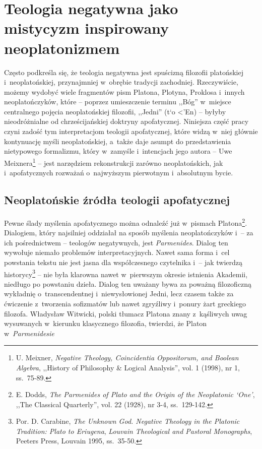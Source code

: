 

\chapter{Teologia negatywna jako mistycyzm inspirowany neoplatonizmem}\label{neopl}

Często podkreśla się, że teologia negatywna jest spuścizną filozofii platońskiej i~neoplatońskiej, przynajmniej w~obrębie tradycji zachodniej. Rzeczywiście, możemy wydobyć wiele fragmentów pism Platona, Plotyna, Proklosa i~innych neoplatończyków, które -- poprzez umieszczenie terminu ,,Bóg'' w~miejsce centralnego pojęcia neoplatońskiej filozofii, ,,Jedni'' (\textgreek{t`o <'En}) -- byłyby nieodróżnialne od chrześcijańskiej doktryny apofatycznej. Niniejsza część pracy czyni zadość tym interpretacjom teologii apofatycznej, które widzą w~niej głównie kontynuację myśli neoplatońskiej, a~także daje asumpt do przedstawienia nietypowego formalizmu, który w~zamyśle i~intencjach jego autora -- Uwe Meixnera\footnote{U. Meixner, \textit{Negative Theology, Coincidentia Oppositorum, and Boolean Algebra}, ,,History of Philosophy \& Logical Analysis'', vol. 1 (1998), nr 1, ss.~75-89.} -- jest narzędziem rekonstrukcji zarówno neoplatońskich, jak i~apofatycznych rozważań o~najwyższym pierwotnym i~absolutnym bycie.

\section{Neoplatońskie źródła teologii apofatycznej}

Pewne ślady myślenia apofatycznego można odnaleźć już w~pismach Platona\footnote{E. Dodds, \textit{The Parmenides of Plato and the Origin of the Neoplatonic ‘One'}, ,,The Classical Quarterly'', vol. 22 (1928), nr 3-4, ss.~129-142.}. Dialogiem, który najsilniej oddziałał na sposób myślenia neoplatończyków i~-- za ich pośrednictwem -- teologów negatywnych, jest \textit{Parmenides}. Dialog ten wywołuje niemało problemów interpretacyjnych. Nawet sama forma i~cel powstania tekstu nie jest jasna dla współczesnego czytelnika i~-- jak twierdzą historycy\footnote{Por. D. Carabine, \textit{The Unknown God. Negative Theology in the Platonic Tradition: Plato to Eriugena}, \textit{Louvain Theological and Pastoral Monographs}, Peeters Press, Louvain 1995, ss.~35-50.} -- nie była klarowna nawet w~pierwszym okresie istnienia Akademii, niedługo po powstaniu dzieła. Dialog ten uważany bywa za poważną filozoficzną wykładnię o~transcendentnej i~niewysłowionej Jedni, lecz czasem także za ćwiczenie z~tworzenia sofizmatów lub nawet zgryźliwy i~ponury żart greckiego filozofa. Władysław Witwicki, polski tłumacz Platona znany z~kąśliwych uwag wysuwanych w~kierunku klasycznego filozofia, twierdzi, że Platon w~\textit{Parmenidesie}

